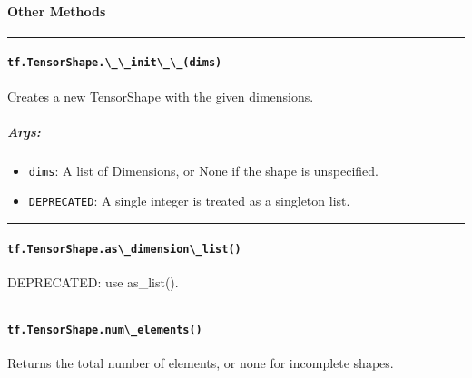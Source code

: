 \paragraph{Other Methods }\label{other-methods-3}

\begin{center}\rule{0.5\linewidth}{\linethickness}\end{center}

\paragraph{\texorpdfstring{\lstinline{tf.TensorShape.\_\_init\_\_(dims)}
}{tf.TensorShape.\_\_init\_\_(dims) }}\label{tf.tensorshape.ux5fux5finitux5fux5fdims}

Creates a new TensorShape with the given dimensions.

\subparagraph{Args: }\label{args-39}

\begin{itemize}
\tightlist
\item
  \lstinline{dims}: A list of Dimensions, or None if the shape is
  unspecified.
\item
  \lstinline{DEPRECATED}: A single integer is treated as a singleton list.
\end{itemize}

\begin{center}\rule{0.5\linewidth}{\linethickness}\end{center}

\paragraph{\texorpdfstring{\lstinline{tf.TensorShape.as\_dimension\_list()}
}{tf.TensorShape.as\_dimension\_list() }}\label{tf.tensorshape.asux5fdimensionux5flist}

DEPRECATED: use as\_list().

\begin{center}\rule{0.5\linewidth}{\linethickness}\end{center}

\paragraph{\texorpdfstring{\lstinline{tf.TensorShape.num\_elements()}
}{tf.TensorShape.num\_elements() }}\label{tf.tensorshape.numux5felements}

Returns the total number of elements, or none for incomplete shapes.

